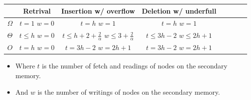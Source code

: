 \begin{frame}
    \framebreak{}
    \begin{center}
    \begin{tabular}{c@{|}ccccccc}
        \toprule
                       & Retrival & Insertion w/ overflow & Deletion w/ underfull \\
            \midrule
            \(\Omega\) & \(t = 1\) \(w = 0\) & \(t = h\) \(w = 1\) & \(t = h\) \(w = 1\) \\
            \midrule
            \(\Theta\) & \(t \leq h\) \(w = 0\) & \(t \leq h + 2 + \frac{2}{\alpha}\) \(w \leq 3 + \frac{2}{\alpha}\) & \(t \leq 3h - 2\) \(w \leq 2h +1\) \\
            \midrule
            \(O\) & \(t = h\) \(w = 0\) & \(t = 3h - 2\) \(w = 2h + 1\) & \(t = 3h - 2\) \(w = 2h + 1\) \\
        \toprule
    \end{tabular}
    \begin{itemize}
        \item Where \(t\) is the number of fetch and readings of nodes on the secondary memory.
        \item And \(w\) is the number of writings of nodes on the secondary memory.
    \end{itemize}
        \cite{bayer_organization_1972}
    \end{center}
\end{frame}
